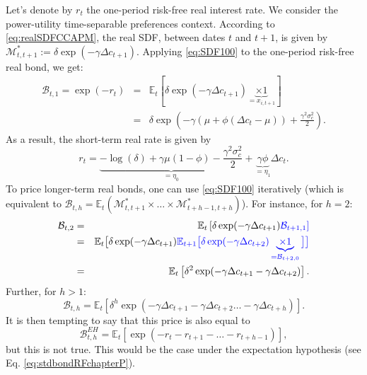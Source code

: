 \documentclass[
  12pt,
]{book}
\theoremstyle{definition}
\theoremstyle{definition}
\theoremstyle{definition}
\theoremstyle{definition}
\theoremstyle{remark}
\begin{document}
Let's denote by \(r_{t}\) the one-period risk-free real interest rate. We consider the power-utility time-separable preferences context. According to \eqref{eq:realSDFCCAPM}, the real SDF, between dates \(t\) and \(t+1\), is given by \(\mathcal{M}^*_{t,t+1}:=\delta\exp(-\gamma \Delta c_{t+1})\). Applying \eqref{eq:SDF100} to the one-period risk-free real bond, we get:
\begin{eqnarray*}
\mathcal{B}_{t,1} = \exp(-r_{t}) &=& \mathbb{E}_t [ \delta \exp(-\gamma \Delta c_{t+1}) \underbrace{\times 1}_{= x_{i,t+1}} ]\\
&=& \delta \exp\left(-\gamma(\mu + \phi (\Delta c_t - \mu))+\frac{\gamma^2\sigma_c^2}{2}\right).
\end{eqnarray*}
As a result, the short-term real rate is given by
\begin{equation}
r_{t} = \underbrace{- \log(\delta) + \gamma \mu (1-\phi)  - \frac{\gamma^2\sigma_c^2}{2}}_{=\eta_0} + \underbrace{\gamma \phi}_{=\eta_1} \Delta c_t.\label{eq:rCCAPM}
\end{equation}
To price longer-term real bonds, one can use \eqref{eq:SDF100} iteratively (which is equivalent to \(\mathcal{B}_{t,h} = \mathbb{E}_t(\mathcal{M}^*_{t,t+1}\times\dots\times\mathcal{M}^*_{t+h-1,t+h})\)). For instance, for \(h=2\):
\begin{eqnarray*}
\mathcal{B}_{t,2} &=&  \mathbb{E}_t \left[ \delta \exp(-\gamma \Delta c_{t+1}) \color{blue}{\mathcal{B}_{t+1,1}} \right]\\
&=& \mathbb{E}_t \big[ \delta \exp(-\gamma \Delta c_{t+1}) \color{blue}{\mathbb{E}_{t+1} \big[ \delta \exp(-\gamma \Delta c_{t+2}) \underbrace{\times 1}_{=\mathcal{B}_{t+2,0}} \big]} \big]\\
&=& \mathbb{E}_t \left[ \delta^2 \exp(-\gamma \Delta c_{t+1} - \gamma \Delta c_{t+2}) \right].
\end{eqnarray*}
Further, for \(h>1\):
\begin{equation}
\mathcal{B}_{t,h} = \mathbb{E}_t \left[ \delta^h \exp(-\gamma \Delta c_{t+1} - \gamma \Delta c_{t+2} \dots - \gamma \Delta c_{t+h}) \right].\label{eq:PthCCAPM}
\end{equation}
It is then tempting to say that this price is also equal to
\begin{equation}
\mathcal{B}^{EH}_{t,h} = \mathbb{E}_t \left[ \exp(- r_{t} - r_{t+1} - \dots - r_{t+h-1}) \right],\label{eq:CCAPMEH}
\end{equation}
but this is not true. This would be the case under the expectation hypothesis (see Eq. \eqref{eq:stdbondRFchapterP}).
\end{document}
